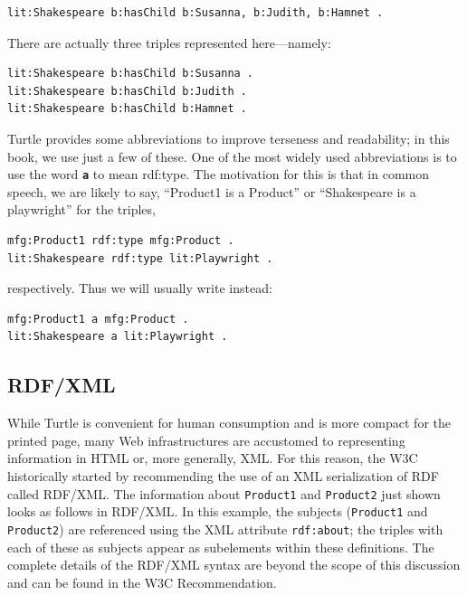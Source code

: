 \begin{lstlisting}
lit:Shakespeare b:hasChild b:Susanna, b:Judith, b:Hamnet .
\end{lstlisting}

There are actually three triples represented here---namely:

\begin{lstlisting}
lit:Shakespeare b:hasChild b:Susanna . 
lit:Shakespeare b:hasChild b:Judith . 
lit:Shakespeare b:hasChild b:Hamnet .
\end{lstlisting}

Turtle provides some abbreviations to improve terseness and readability;
in this book, we use just a few of these. One of the most widely used
abbreviations is to use the word \textbf{\texttt{a}} to mean rdf:type. The motivation for
this is that in common speech, we are likely to say, ``Product1 is a
Product'' or ``Shakespeare is a playwright'' for the triples,

\begin{lstlisting}
mfg:Product1 rdf:type mfg:Product . 
lit:Shakespeare rdf:type lit:Playwright .
\end{lstlisting}

respectively. Thus we will usually write instead:

\begin{lstlisting}
mfg:Product1 a mfg:Product . 
lit:Shakespeare a lit:Playwright .
\end{lstlisting}

\subsection{RDF/XML}

While Turtle is convenient for human consumption and is more compact for
the printed page, many Web infrastructures are accustomed to
representing information in HTML or, more generally, XML. For this
reason, the W3C historically started by recommending the use of an XML
serialization of RDF called RDF/XML. The information about \texttt{Product1} and
\texttt{Product2} just shown looks as follows in RDF/XML. In this example, the
subjects (\texttt{Product1} and \texttt{Product2}) are referenced using the XML attribute
\texttt{rdf:about}; the triples with each of these as subjects appear as
subelements within these definitions. The complete details of the
RDF/XML syntax are beyond the scope of this discussion and can be found in the W3C Recommendation. \cite{Schreiber:14:RXS}

